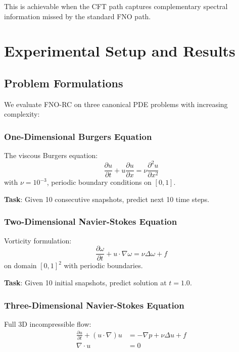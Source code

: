 \documentclass[11pt,twocolumn]{article}
\begin{document}
This is achievable when the CFT path captures complementary spectral information missed by the standard FNO path.

\section{Experimental Setup and Results}

\subsection{Problem Formulations}

We evaluate FNO-RC on three canonical PDE problems with increasing complexity:

\subsubsection{One-Dimensional Burgers Equation}

The viscous Burgers equation:
\begin{equation}
\frac{\partial u}{\partial t} + u \frac{\partial u}{\partial x} = \nu \frac{\partial^2 u}{\partial x^2}
\end{equation}
with $\nu = 10^{-3}$, periodic boundary conditions on $[0, 1]$.

\textbf{Task}: Given 10 consecutive snapshots, predict next 10 time steps.

\subsubsection{Two-Dimensional Navier-Stokes Equation}

Vorticity formulation:
\begin{equation}
\frac{\partial \omega}{\partial t} + u \cdot \nabla \omega = \nu \Delta \omega + f
\end{equation}
on domain $[0, 1]^2$ with periodic boundaries.

\textbf{Task}: Given 10 initial snapshots, predict solution at $t = 1.0$.

\subsubsection{Three-Dimensional Navier-Stokes Equation}

Full 3D incompressible flow:
\begin{align}
\frac{\partial u}{\partial t} + (u \cdot \nabla) u &= -\nabla p + \nu \Delta u + f \\
\nabla \cdot u &= 0
\end{align}
\end{document}
